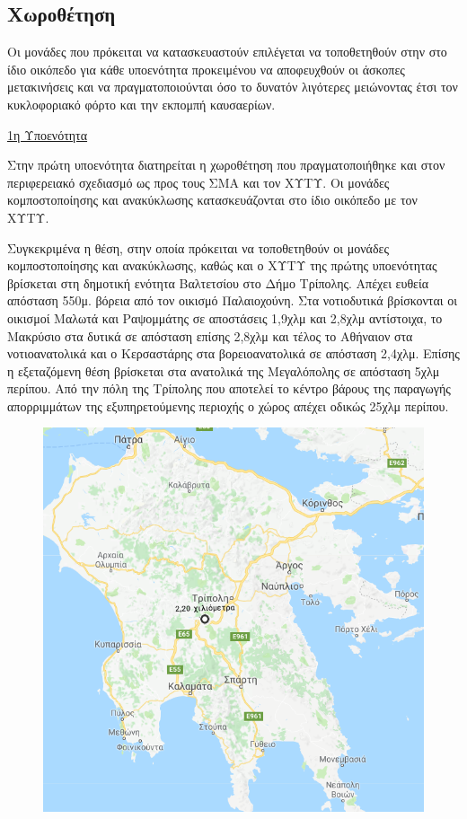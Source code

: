 \documentclass[12pt]{article}
\begin{document}
 	\subsection{Χωροθέτηση}
 	
 	Οι μονάδες που πρόκειται να κατασκευαστούν επιλέγεται να τοποθετηθούν στην στο ίδιο οικόπεδο για κάθε υποενότητα προκειμένου να αποφευχθούν οι άσκοπες μετακινήσεις και να πραγματοποιούνται όσο το δυνατόν λιγότερες μειώνοντας έτσι τον κυκλοφοριακό φόρτο και την εκπομπή καυσαερίων. 
 	
 	\underline{1η Υποενότητα}
 	
 	Στην πρώτη υποενότητα διατηρείται η χωροθέτηση που πραγματοποιήθηκε και στον περιφερειακό σχεδιασμό ως προς τους ΣΜΑ και τον ΧΥΤΥ. Οι μονάδες κομποστοποίησης και ανακύκλωσης κατασκευάζονται στο ίδιο οικόπεδο με τον ΧΥΤΥ.
 	
 	Συγκεκριμένα η θέση, στην οποία πρόκειται να τοποθετηθούν οι μονάδες κομποστοποίησης και ανακύκλωσης, καθώς και ο ΧΥΤΥ  της πρώτης υποενότητας βρίσκεται στη δημοτική ενότητα Βαλτετσίου στο Δήμο Τρίπολης. Απέχει ευθεία απόσταση 550μ. βόρεια από τον οικισμό Παλαιοχούνη. Στα νοτιοδυτικά βρίσκονται οι οικισμοί Μαλωτά και Ραψομμάτης σε αποστάσεις 1,9χλμ και 2,8χλμ αντίστοιχα, το Μακρύσιο στα δυτικά σε απόσταση επίσης 2,8χλμ και τέλος το Αθήναιον στα νοτιοανατολικά και ο Κερσαστάρης στα βορειοανατολικά σε απόσταση 2,4χλμ. Επίσης η εξεταζόμενη θέση βρίσκεται στα ανατολικά της Μεγαλόπολης σε απόσταση 5χλμ περίπου. Από την πόλη της Τρίπολης που αποτελεί το κέντρο βάρους της παραγωγής απορριμμάτων της εξυπηρετούμενης περιοχής ο χώρος απέχει οδικώς 25χλμ περίπου.
 	
 	\begin{figure} [H]
 		\begin{center}
 			\includegraphics [scale = 0.50] {map35.png}
 		\end{center}
 	\end{figure}
 
\end{document}
